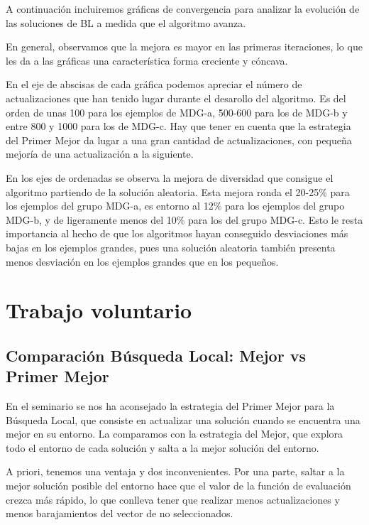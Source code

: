 \documentclass{article}
\begin{document}
   A continuación incluiremos gráficas de convergencia para analizar la evolución de las soluciones de BL a medida que el algoritmo
   avanza.
   
\pagebreak
   

En general, observamos que la mejora es mayor en las primeras iteraciones, lo que les da a las gráficas una característica forma
creciente y cóncava.

En el eje de abscisas de cada gráfica podemos apreciar el número de actualizaciones que han tenido lugar durante el desarollo del
 algoritmo.
Es del orden de unas 100 para los ejemplos de MDG-a, 500-600 para los de MDG-b y entre 800 y 1000 para los de MDG-c. Hay que 
tener en cuenta que la estrategia del Primer Mejor da lugar a una gran cantidad de actualizaciones, con pequeña mejoría de
una actualización a la siguiente.

En los ejes de ordenadas se observa la mejora de diversidad que consigue el algoritmo partiendo de la solución aleatoria. Esta mejora ronda el 
20-25\% para los ejemplos del grupo MDG-a, es entorno al 12\% para los ejemplos del grupo MDG-b, y de ligeramente menos del 10\%
para los del grupo MDG-c. Esto le resta importancia al hecho de que los algoritmos hayan conseguido desviaciones más bajas en los
ejemplos grandes, pues una solución aleatoria también presenta menos desviación en los ejemplos grandes que en los pequeños.

\pagebreak

\section{Trabajo voluntario}

\subsection{Comparación Búsqueda Local: Mejor vs Primer Mejor}

En el seminario se nos ha aconsejado la estrategia del Primer Mejor para la Búsqueda Local, que consiste en actualizar una
solución cuando se encuentra una mejor en su entorno. La comparamos con la estrategia del Mejor, que explora todo el entorno
de cada solución y salta a la mejor solución del entorno.

A priori, tenemos una ventaja y dos inconvenientes. Por una parte, saltar a la mejor solución posible del entorno hace que el
valor de la función de evaluación crezca más rápido, lo que conlleva tener que realizar menos actualizaciones y menos barajamientos
del vector de no seleccionados.
\end{document}
